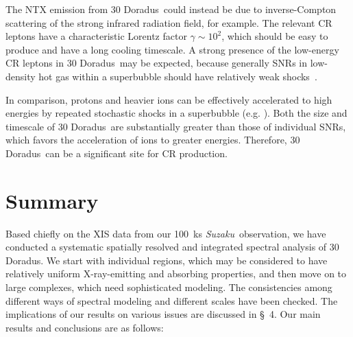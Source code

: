 \documentclass[usenatbib]{mnras}
\def\xs{30 Doradus}
\def\suzaku{{\sl Suzaku}}
\begin{document}
The NTX emission from \xs\ could instead be due to inverse-Compton scattering of the strong infrared radiation field, for example. The relevant CR leptons have a characteristic Lorentz factor $\gamma \sim 10^2$, which should be easy to produce and have a long cooling timescale. A strong presence of the low-energy CR leptons in \xs\ may be expected, because generally SNRs in low-density hot gas within a superbubble should have relatively weak shocks~\citep{Tang2005, Sharma}.  

In comparison, protons and heavier ions can be effectively accelerated to high energies by repeated stochastic shocks in a superbubble (e.g. \citealt{Lingenfelter2019}). Both the size and timescale of \xs\ are substantially greater than those of individual SNRs, which favors the acceleration of ions to greater energies. Therefore, \xs\ can  be a significant site for CR production. 

\section{Summary}
\label{s:sum}
Based chiefly on the XIS data from our 100~ks \suzaku\ observation, we have conducted a systematic spatially resolved and integrated spectral analysis of \xs. 
We start with individual regions, which may be considered to have relatively uniform X-ray-emitting and absorbing properties, and then move on to large complexes, which need sophisticated modeling. The consistencies among different ways of spectral modeling and different scales have been checked. The implications of our results on various issues are discussed in \S~4. Our main results and conclusions are as follows:
\end{document}
